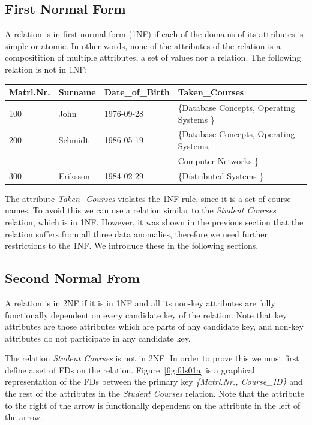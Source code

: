 \subsection{First Normal Form} 
A relation is in first normal form (1NF) if each of
the domains of its attributes is simple or atomic. 
In other words, none of the attributes of the relation is a compositition of multiple attributes, 
a set of values nor a relation. The following relation is not in 1NF:

\begin{center}
\begin{tabular}[h]{|l|l|l|l|}
  \hline
  Matrl.Nr. & Surname & Date\_of\_Birth & Taken\_Courses \\ \hline
  100 & John & 1976-09-28 & \{Database Concepts, Operating Systems \} \\  
  200 & Schmidt & 1986-05-19 & \{Database Concepts, Operating Systems,  \\ 
      &         &            & Computer Networks \} \\
  300 & Eriksson & 1984-02-29 & \{Distributed Systems \} \\ \hline
\end{tabular}
\end{center}

The attribute \textit{Taken\_Courses} violates the 1NF rule, since it is a set of 
course names. To avoid this we can use a relation similar to the \textit{Student Courses} relation,
which is in 1NF. However, it was shown in the previous section that the relation suffers
from all three data anomalies, therefore we need further restrictions to the 1NF. We
introduce these in the following sections.  

\subsection{Second Normal From}
A relation is in 2NF if it is in 1NF and all its non-key attributes are fully
functionally dependent on every candidate key of the relation.
Note that key attributes are those attributes which are parts of any 
candidate key, and non-key attributes do not participate in any candidate key. 

The relation \textit{Student Courses} is not in 2NF. In order to prove this we must
first define a set of FDs on the relation. Figure~\ref{fig:fds01a} is a graphical representation 
of the FDs between the primary key \textit{\{Matrl.Nr., Course\_ID\}} and the rest of the 
attributes in the \textit{Student Courses} relation. 
Note that the attribute to the right of the arrow is functionally dependent on the attribute 
in the left of the arrow.  

